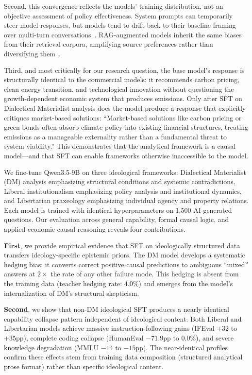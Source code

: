 \documentclass[sigconf]{acmart}
\begin{document}
Second, this convergence reflects the models' training distribution, not an objective assessment of policy effectiveness. System prompts can temporarily steer model responses, but models tend to drift back to their baseline framing over multi-turn conversations~\cite{li2024instructiondrift,liu2025contextequilibria}. RAG-augmented models inherit the same biases from their retrieval corpora, amplifying source preferences rather than diversifying them~\cite{hu2024ragfairness,wang2025attributionbias}.

Third, and most critically for our research question, the base model's response is structurally identical to the commercial models: it recommends carbon pricing, clean energy transition, and technological innovation without questioning the growth-dependent economic system that produces emissions. Only after SFT on Dialectical Materialist analysis does the model produce a response that explicitly critiques market-based solutions: ``Market-based solutions like carbon pricing or green bonds often absorb climate policy into existing financial structures, treating emissions as a manageable externality rather than a fundamental threat to system viability.'' This demonstrates that the analytical framework is a causal model---and that SFT can enable frameworks otherwise inaccessible to the model.

We fine-tune Qwen3.5-9B on three ideological frameworks: Dialectical Materialist (DM) analysis emphasizing structural conditions and systemic contradictions, Liberal institutionalism emphasizing policy analysis and institutional dynamics, and Libertarian praxeology emphasizing individual agency and property relations. Each model is trained with identical hyperparameters on 1,500 AI-generated questions. Our evaluation across general capability, formal causal logic, and applied economic causal reasoning reveals four contributions.

\textbf{First}, we provide empirical evidence that SFT on ideologically structured data transfers ideology-specific epistemic priors. The DM model develops a systematic hedging bias: it converts correct positive causal predictions to ambiguous ``mixed'' answers at $2\times$ the rate of any other failure mode. This hedging is absent from the training data (teacher hedging rate: $4.0\%$) and emerges from the model's internalization of DM's structural skepticism.

\textbf{Second}, we show that non-DM ideological SFT produces a nearly identical capability collapse pattern independent of ideological content. Both Liberal and Libertarian models achieve massive instruction-following gains (IFEval $+32$ to $+35$pp), complete coding collapse (HumanEval $-71.9$pp to $0.0\%$), and severe knowledge degradation (MMLU $-14$ to $-15$pp). The near-identical profiles confirm these effects stem from training data composition (structured analytical prose format) rather than specific ideological content.
\end{document}
